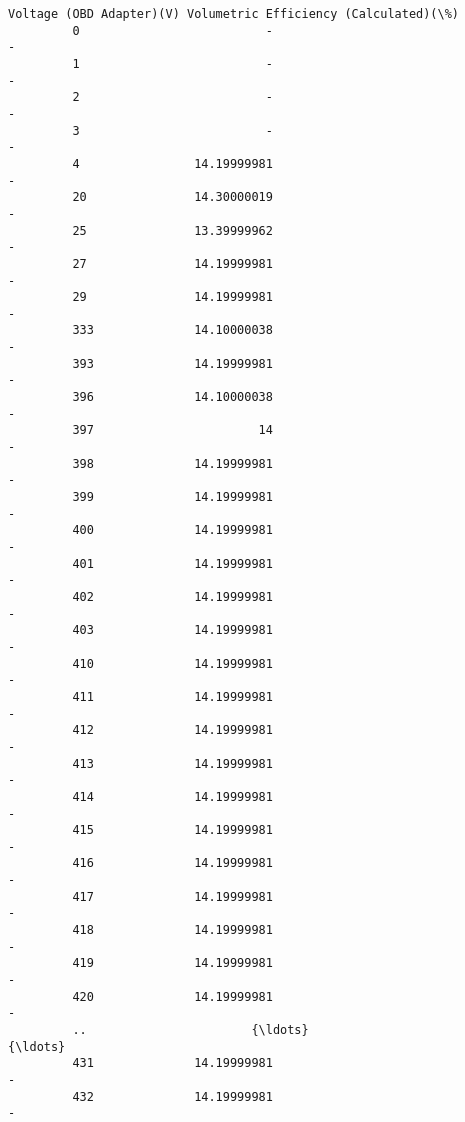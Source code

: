 \documentclass[11pt]{article}
\begin{document}
\begin{Verbatim}[commandchars=\\\{\}]
             Voltage (OBD Adapter)(V) Volumetric Efficiency (Calculated)(\%)  
         0                          -                                     -  
         1                          -                                     -  
         2                          -                                     -  
         3                          -                                     -  
         4                14.19999981                                     -  
         20               14.30000019                                     -  
         25               13.39999962                                     -  
         27               14.19999981                                     -  
         29               14.19999981                                     -  
         333              14.10000038                                     -  
         393              14.19999981                                     -  
         396              14.10000038                                     -  
         397                       14                                     -  
         398              14.19999981                                     -  
         399              14.19999981                                     -  
         400              14.19999981                                     -  
         401              14.19999981                                     -  
         402              14.19999981                                     -  
         403              14.19999981                                     -  
         410              14.19999981                                     -  
         411              14.19999981                                     -  
         412              14.19999981                                     -  
         413              14.19999981                                     -  
         414              14.19999981                                     -  
         415              14.19999981                                     -  
         416              14.19999981                                     -  
         417              14.19999981                                     -  
         418              14.19999981                                     -  
         419              14.19999981                                     -  
         420              14.19999981                                     -  
         ..                       {\ldots}                                   {\ldots}  
         431              14.19999981                                     -  
         432              14.19999981                                     -  

\end{Verbatim}
\end{document}
